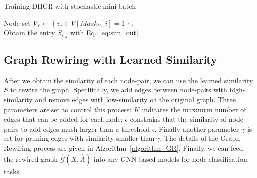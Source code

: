 \documentclass[sigconf]{acmart}
\begin{document}
	\begin{algorithm}
		\caption{Training DHGR with stochastic mini-batch}
		\label{algorithm:training}
		\LinesNumbered
		Node set  $V_Y \leftarrow \left\{v_i\in V\ |\ Mask_Y[i]=1 \right\}$.\\
		Obtain the entry $S_{i,j}$ with Eq.~\ref{eq:sim_out}. 
	\end{algorithm}
	

	\subsection{Graph Rewiring with Learned Similarity}
	
	
	After we obtain the similarity of each node-pair, we can use the learned similarity $S$ to rewire the graph. Specifically, we add edges between node-pairs with high-similarity and remove edges with low-similarity on the original graph. Three parameters are set to control this process: $K$ indicates the maximum number of edges that can be added for each node; $\epsilon$ constrains that the similarity of node-pairs to add edges mush larger than a threshold $\epsilon$.  Finally another parameter $\gamma$ is set for pruning edges with similarity smaller than $\gamma$. The details of the Graph Rewiring process are given in Algorithm~\ref{algorithm_GR}. Finally, we can feed the rewired graph $\widehat{\mathcal{G}}(X, \widehat{A})$ into any GNN-based models for node classification tasks.
	
\end{document}
